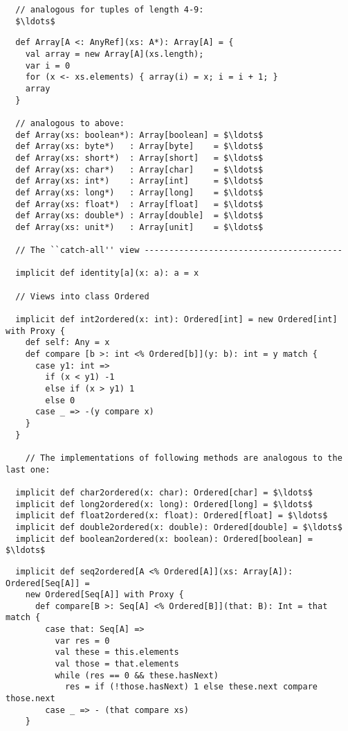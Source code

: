 {\begin{lstlisting}
  // analogous for tuples of length 4-9:
  $\ldots$

\end{lstlisting}
\newpage
\begin{lstlisting}
  def Array[A <: AnyRef](xs: A*): Array[A] = {
    val array = new Array[A](xs.length);
    var i = 0
    for (x <- xs.elements) { array(i) = x; i = i + 1; }
    array
  }

  // analogous to above:
  def Array(xs: boolean*): Array[boolean] = $\ldots$
  def Array(xs: byte*)   : Array[byte]    = $\ldots$
  def Array(xs: short*)  : Array[short]   = $\ldots$
  def Array(xs: char*)   : Array[char]    = $\ldots$
  def Array(xs: int*)    : Array[int]     = $\ldots$
  def Array(xs: long*)   : Array[long]    = $\ldots$
  def Array(xs: float*)  : Array[float]   = $\ldots$
  def Array(xs: double*) : Array[double]  = $\ldots$
  def Array(xs: unit*)   : Array[unit]    = $\ldots$

  // The ``catch-all'' view ----------------------------------------

  implicit def identity[a](x: a): a = x

  // Views into class Ordered

  implicit def int2ordered(x: int): Ordered[int] = new Ordered[int] with Proxy {
    def self: Any = x
    def compare [b >: int <% Ordered[b]](y: b): int = y match {
      case y1: int =>
        if (x < y1) -1
        else if (x > y1) 1
        else 0
      case _ => -(y compare x)
    }
  }

    // The implementations of following methods are analogous to the last one:

  implicit def char2ordered(x: char): Ordered[char] = $\ldots$ 
  implicit def long2ordered(x: long): Ordered[long] = $\ldots$ 
  implicit def float2ordered(x: float): Ordered[float] = $\ldots$
  implicit def double2ordered(x: double): Ordered[double] = $\ldots$
  implicit def boolean2ordered(x: boolean): Ordered[boolean] = $\ldots$

\end{lstlisting}
\newpage
\begin{lstlisting}
  implicit def seq2ordered[A <% Ordered[A]](xs: Array[A]): Ordered[Seq[A]] = 
    new Ordered[Seq[A]] with Proxy {
      def compare[B >: Seq[A] <% Ordered[B]](that: B): Int = that match {
        case that: Seq[A] =>
          var res = 0
          val these = this.elements
          val those = that.elements
          while (res == 0 && these.hasNext)
            res = if (!those.hasNext) 1 else these.next compare those.next
        case _ => - (that compare xs)
    }


\end{lstlisting}}
